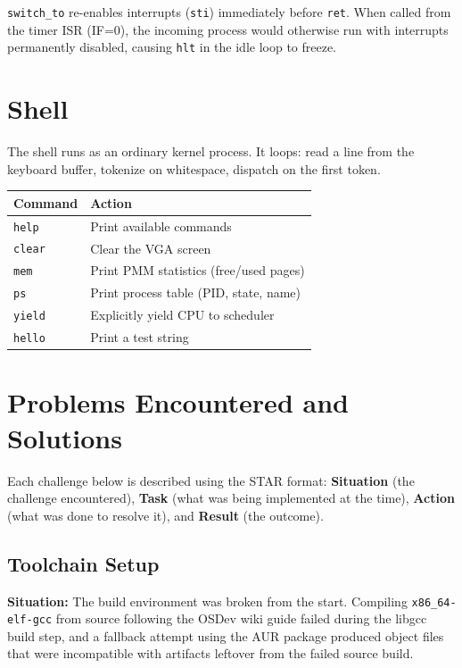 \documentclass[12pt,a4paper]{article}
\begin{document}
\texttt{switch\_to} re-enables interrupts (\texttt{sti}) immediately before \texttt{ret}. When called from the timer ISR (IF=0), the incoming process would otherwise run with interrupts permanently disabled, causing \texttt{hlt} in the idle loop to freeze.

\section{Shell}

The shell runs as an ordinary kernel process. It loops: read a line from the keyboard buffer, tokenize on whitespace, dispatch on the first token.

\begin{center}
\begin{tabular}{ll}
\toprule
\textbf{Command} & \textbf{Action} \\
\midrule
\texttt{help}  & Print available commands \\
\texttt{clear} & Clear the VGA screen \\
\texttt{mem}   & Print PMM statistics (free/used pages) \\
\texttt{ps}    & Print process table (PID, state, name) \\
\texttt{yield} & Explicitly yield CPU to scheduler \\
\texttt{hello} & Print a test string \\
\bottomrule
\end{tabular}
\end{center}

\section{Problems Encountered and Solutions}

Each challenge below is described using the STAR format: \textbf{Situation} (the challenge encountered), \textbf{Task} (what was being implemented at the time), \textbf{Action} (what was done to resolve it), and \textbf{Result} (the outcome).

\subsection{Toolchain Setup}

\textbf{Situation:} The build environment was broken from the start. Compiling \texttt{x86\_64-elf-gcc} from source following the OSDev wiki guide failed during the libgcc build step, and a fallback attempt using the AUR package produced object files that were incompatible with artifacts leftover from the failed source build.
\end{document}
